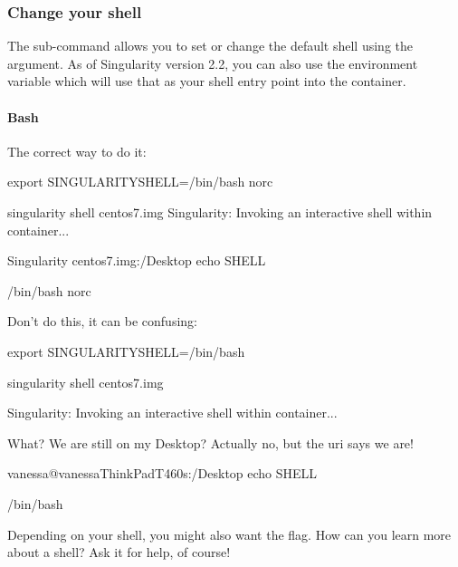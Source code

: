 \documentclass[letterpaper,10pt,english]{sphinxmanual}
\begin{document}
\subsubsection{Change your shell}
\label{\detokenize{appendix:change-your-shell}}
The  sub-command allows you to set or change the default shell using the 
argument. As of Singularity version 2.2, you can also use the
environment variable  which will use that as your shell entry point into
the container.


\paragraph{Bash}
\label{\detokenize{appendix:bash}}
The correct way to do it:

%
\begin{sphinxVerbatim}[commandchars=\\\{\}]
export SINGULARITY\PYGZus{}SHELL=\PYGZdq{}/bin/bash \PYGZhy{}\PYGZhy{}norc\PYGZdq{}

singularity shell centos7.img Singularity: Invoking an interactive shell within container...

Singularity centos7.img:\PYGZti{}/Desktop\PYGZgt{} echo \PYGZdl{}SHELL

/bin/bash \PYGZhy{}\PYGZhy{}norc
\end{sphinxVerbatim}

Don’t do this, it can be confusing:

%
\begin{sphinxVerbatim}[commandchars=\\\{\}]
\PYGZdl{} export SINGULARITY\PYGZus{}SHELL=/bin/bash

\PYGZdl{} singularity shell centos7.img

Singularity: Invoking an interactive shell within container...


\PYGZsh{} What? We are still on my Desktop? Actually no, but the uri says we are!

vanessa@vanessa\PYGZhy{}ThinkPad\PYGZhy{}T460s:\PYGZti{}/Desktop\PYGZdl{} echo \PYGZdl{}SHELL

/bin/bash
\end{sphinxVerbatim}

Depending on your shell, you might also want the  flag. How can you learn
more about a shell? Ask it for help, of course!
\end{document}
